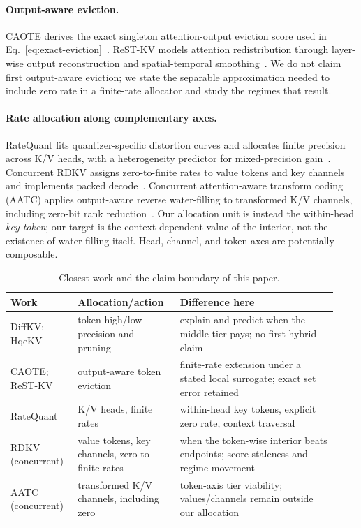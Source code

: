 \documentclass{article}
\theoremstyle{definition}
\begin{document}
\paragraph{Output-aware eviction.}
CAOTE derives the exact singleton attention-output eviction score used in Eq.~\ref{eq:exact-eviction}~\citep{goel2025caote}.  ReST-KV models attention redistribution through layer-wise output reconstruction and spatial-temporal smoothing~\citep{an2026restkv}.  We do not claim first output-aware eviction; we state the separable approximation needed to include zero rate in a finite-rate allocator and study the regimes that result.

\paragraph{Rate allocation along complementary axes.}
RateQuant fits quantizer-specific distortion curves and allocates finite precision across K/V heads, with a heterogeneity predictor for mixed-precision gain~\citep{zuo2026ratequant}.  Concurrent RDKV assigns zero-to-finite rates to value tokens and key channels and implements packed decode~\citep{zhang2026rdkv}.  Concurrent attention-aware transform coding (AATC) applies output-aware reverse water-filling to transformed K/V channels, including zero-bit rank reduction~\citep{laus2026aatc}.  Our allocation unit is instead the within-head \emph{key-token}; our target is the context-dependent value of the interior, not the existence of water-filling itself.  Head, channel, and token axes are potentially composable.

\begin{table}[t]
\centering
\footnotesize
\setlength{\tabcolsep}{3pt}
\caption{Closest work and the claim boundary of this paper.}
\label{tab:related}
\begin{tabular}{@{}p{0.19\linewidth}p{0.29\linewidth}p{0.45\linewidth}@{}}
\toprule
\textbf{Work} & \textbf{Allocation/action} & \textbf{Difference here} \\
\midrule
DiffKV; HqeKV & token high/low precision and pruning & explain and predict when the middle tier pays; no first-hybrid claim \\
CAOTE; ReST-KV & output-aware token eviction & finite-rate extension under a stated local surrogate; exact set error retained \\
RateQuant & K/V heads, finite rates & within-head key tokens, explicit zero rate, context traversal \\
RDKV (concurrent) & value tokens, key channels, zero-to-finite rates & when the token-wise interior beats endpoints; score staleness and regime movement \\
AATC (concurrent) & transformed K/V channels, including zero & token-axis tier viability; values/channels remain outside our allocation \\
\bottomrule
\end{tabular}
\vspace{-2mm}
\end{table}
\end{document}

